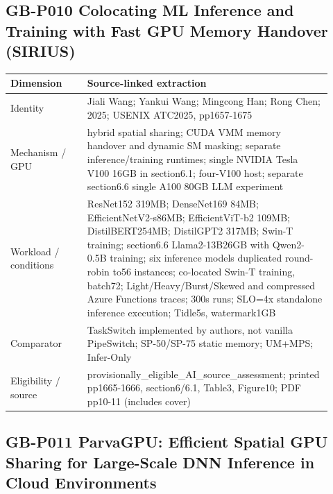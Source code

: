 \documentclass[12pt,a4paper]{article}
\begin{document}
\subsection*{GB-P010 Colocating ML Inference and Training with Fast GPU Memory Handover (SIRIUS)}
\cite{GB-P010}

{\small\begin{longtable}{>{\raggedright\arraybackslash}p{0.22\linewidth}>{\raggedright\arraybackslash}p{0.7\linewidth}}
\toprule
Dimension & Source-linked extraction\\\midrule
\endhead
Identity & Jiali Wang; Yankui Wang; Mingcong Han; Rong Chen; 2025; USENIX ATC2025, pp1657-1675\\
Mechanism /\allowbreak{} GPU & hybrid spatial sharing; CUDA VMM memory handover and dynamic SM masking; separate inference/\allowbreak{}training runtimes; single NVIDIA Tesla V100 16GB in section6.1; four-V100 host; separate section6.6 single A100 80GB LLM experiment\\
Workload /\allowbreak{} conditions & ResNet152 319MB; DenseNet169 84MB; EfficientNetV2-s86MB; EfficientViT-b2 109MB; DistilBERT254MB; DistilGPT2 317MB; Swin-T training; section6.6 Llama2-13B26GB with Qwen2-0.5B training; six inference models duplicated round-robin to56 instances; co-located Swin-T training, batch72; Light/\allowbreak{}Heavy/\allowbreak{}Burst/\allowbreak{}Skewed and compressed Azure Functions traces; 300s runs; SLO=4x standalone inference execution; Tidle5s, watermark1GB\\
Comparator & TaskSwitch implemented by authors, not vanilla PipeSwitch; SP-50/\allowbreak{}SP-75 static memory; UM+MPS; Infer-Only\\
Eligibility /\allowbreak{} source & provisionally\_\allowbreak{}eligible\_\allowbreak{}AI\_\allowbreak{}source\_\allowbreak{}assessment; printed pp1665-1666, section6/\allowbreak{}6.1, Table3, Figure10; PDF pp10-11 (includes cover)\\
\bottomrule
\end{longtable}}

\subsection*{GB-P011 ParvaGPU:\allowbreak{} Efficient Spatial GPU Sharing for Large-Scale DNN Inference in Cloud Environments}
\cite{GB-P011}
\end{document}
